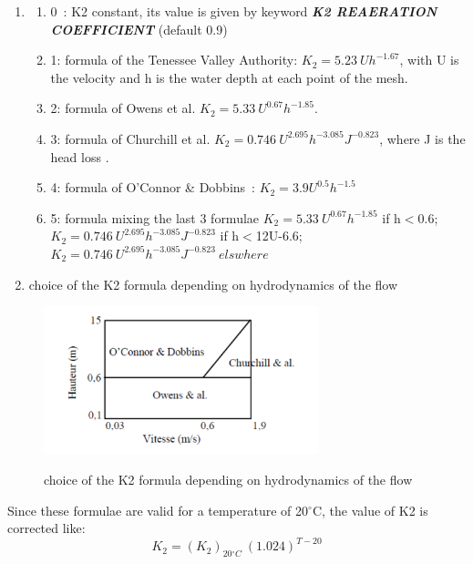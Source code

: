 \begin{enumerate}
\item \begin{enumerate}
\item  0~: K2 constant, its value is given by keyword\textbf{ \textit{K2 REAERATION COEFFICIENT}} (default 0.9)

\item  1: formula of the Tenessee Valley Authority: $K_2=5.23\ Uh^{-1.67}$, with U is the velocity and h is the water depth at each point of the mesh.

\item  2: formula of Owens et al.  $K_2=5.33\ U^{0.67}h^{-1.85}$.

\item  3: formula of Churchill et al. $K_2=0.746\ U^{2.695}h^{-3.085}J^{-0.823}$, where J is the head loss .

\item  4: formula of O'Connor \& Dobbins~: $K_2=3.9U^{0.5}h^{-1.5}$

\item  5: formula mixing the last 3 formulae $K_2=5.33\ U^{0.67}h^{-1.85}$ if h$<$0.6; $K_2=0.746\ U^{2.695}h^{-3.085}J^{-0.823}$ if h$<$12U-6.6; $K_2=0.746\ U^{2.695}h^{-3.085}J^{-0.823}\ elswhere$
\end{enumerate}

\item  choice of the K2 formula depending on hydrodynamics of the flow
\end{enumerate}
\begin{figure}
  \centering
  \includegraphics[width=8cm]{./graphics/k2diagram.png}\\
  \caption{choice of the K2 formula depending on hydrodynamics of the flow}\label{k2choice}
\end{figure}


 Since these formulae are valid for a temperature of 20${}^\circ$C, the value of K2 is corrected like:
\[K_2={\left(K_2\right)}_{20{}^\circ C}\ {\left(1.024\right)}^{T-20}\]


